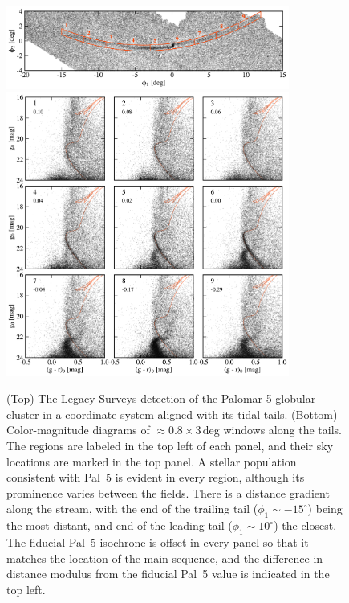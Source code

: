 \documentclass[twocolumn]{aastex62}
\begin{document}
\begin{figure}
\begin{center}
\includegraphics[width=0.83\textwidth]{fig1_a_map.pdf}
\includegraphics[width=0.83\textwidth]{fig1_b_cmds.pdf}
\end{center}
\caption{
(Top) The Legacy Surveys detection of the Palomar 5 globular cluster in a coordinate system aligned with its tidal tails.
(Bottom) Color-magnitude diagrams of $\approx0.8\times3$\,deg windows along the tails.
The regions are labeled in the top left of each panel, and their sky locations are marked in the top panel.
A stellar population consistent with Pal~5 is evident in every region, although its prominence varies between the fields.
There is a distance gradient along the stream, with the end of the trailing tail ($\phi_1\sim-15^\circ$) being the most distant, and end of the leading tail ($\phi_1\sim10^\circ$) the closest.
The fiducial Pal~5 isochrone is offset in every panel so that it matches the location of the main sequence, and the difference in distance modulus from the fiducial Pal~5 value is indicated in the top left.
}
\label{fig:cmds}
\end{figure}
\end{document}
